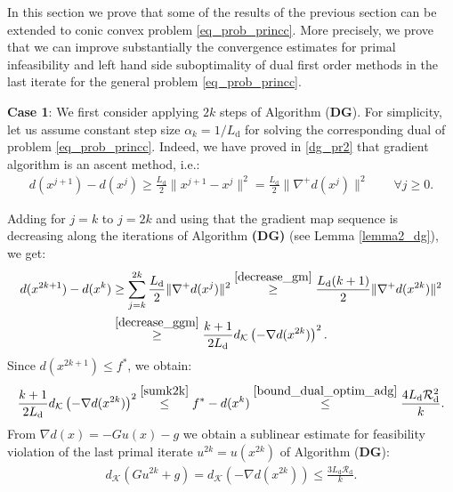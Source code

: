 \documentclass{gOMS2e}
\theoremstyle{plain}
\theoremstyle{definition}
\theoremstyle{remark}
\begin{document}
In this section we prove that some of the results of the previous
section can be extended to conic  convex  problem
\eqref{eq_prob_princc}. More precisely, we prove that we can improve
substantially the convergence estimates for primal infeasibility and
left hand side suboptimality  of dual first order methods  in the last iterate for the general problem \eqref{eq_prob_princc}.

\vspace{0.2cm}

\noindent \textbf{Case 1}:  We first consider  applying $2k$ steps
of  Algorithm  (\textbf{DG}).  For simplicity,    let us assume
constant step size $\alpha_k = 1/L_\text{d}$ for solving the
corresponding  dual of  problem \eqref{eq_prob_princc}. Indeed, we
have proved in \eqref{dg_pr2} that gradient algorithm is an ascent
method, i.e.:
\begin{align*}
d(x^{j+1}) - d(x^j)  \geq  \frac{L_\text{d}}{2}  \|x^{j+1} - x^j \|^2 =
\frac{L_\text{d}}{2} \|\nabla^+ d(x^j)\|^2   \qquad \forall j \geq 0.
\end{align*}

\noindent  Adding for $j=k$ to $j=2k$ and using that the gradient
map sequence is decreasing along the iterations of Algorithm {\bf
(DG)} (see Lemma \ref{lemma2_dg}),  we get:
\begin{align}
\label{sumk2k_cone} d(x^{2k+1}) -  d(x^{k})  & \geq  \sum_{j=k}^{2k}
\frac{L_\text{d}}{2} \|\nabla^+ d(x^j)\|^2
\overset{\eqref{decrease_gm}}{\geq} \frac{L_\text{d}(k+1)}{2}
\|\nabla^+ d(x^{2k})\|^2  \nonumber \\
& \overset{\eqref{decrease_ggm}}{\geq} \frac{k+1}{2L_\text{d}}
 d_{\mathcal{K}} \left(-\nabla d(x^{2k}) \right)^2.
\end{align}
Since $d(x^{2k+1}) \leq f^*$, we obtain:
\[ \frac{k+1}{2L_\text{d}} d_{\mathcal{K}} \left(-\nabla d(x^{2k}) \right)^2  \overset{\eqref{sumk2k}}{\leq} f^* -
d(x^{k}) \overset{\eqref{bound_dual_optim_adg}}{\leq} \frac{4
L_\text{d} \mathcal{R}_\text{d}^2}{k}.   \] From $\nabla d(x) = -G
u(x) - g$  we obtain a sublinear estimate for feasibility violation
of the last primal iterate $u^{2k} = u(x^{2k})$ of Algorithm
(\textbf{DG}):
\begin{align}
\label{conegpf} d_{\mathcal{K}}(G u^{2k} + g) = d_{\mathcal{K}}(-\nabla d(x^{2k}))
\leq  \frac{3 L_\text{d} \mathcal{R}_\text{d}}{k}.
\end{align}
\end{document}

